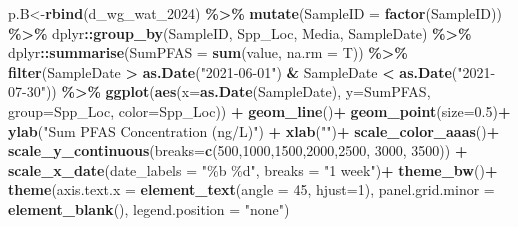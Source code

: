 \documentclass[
]{article}
\newenvironment{Shaded}{\begin{snugshade}}{\end{snugshade}}
\newcommand{\AttributeTok}[1]{\textcolor[rgb]{0.13,0.29,0.53}{#1}}
\newcommand{\DecValTok}[1]{\textcolor[rgb]{0.00,0.00,0.81}{#1}}
\newcommand{\FloatTok}[1]{\textcolor[rgb]{0.00,0.00,0.81}{#1}}
\newcommand{\FunctionTok}[1]{\textcolor[rgb]{0.13,0.29,0.53}{\textbf{#1}}}
\newcommand{\NormalTok}[1]{#1}
\newcommand{\OtherTok}[1]{\textcolor[rgb]{0.56,0.35,0.01}{#1}}
\newcommand{\SpecialCharTok}[1]{\textcolor[rgb]{0.81,0.36,0.00}{\textbf{#1}}}
\newcommand{\StringTok}[1]{\textcolor[rgb]{0.31,0.60,0.02}{#1}}
\begin{document}
\begin{Shaded}
\begin{Highlighting}[]
\NormalTok{p.B}\OtherTok{\textless{}{-}}\FunctionTok{rbind}\NormalTok{(d\_wg\_wat\_2024) }\SpecialCharTok{\%\textgreater{}\%}
  \FunctionTok{mutate}\NormalTok{(}\AttributeTok{SampleID =} \FunctionTok{factor}\NormalTok{(SampleID)) }\SpecialCharTok{\%\textgreater{}\%}
\NormalTok{  dplyr}\SpecialCharTok{::}\FunctionTok{group\_by}\NormalTok{(SampleID, Spp\_Loc, Media, SampleDate) }\SpecialCharTok{\%\textgreater{}\%}
\NormalTok{  dplyr}\SpecialCharTok{::}\FunctionTok{summarise}\NormalTok{(}\AttributeTok{SumPFAS =} \FunctionTok{sum}\NormalTok{(value, }\AttributeTok{na.rm =}\NormalTok{ T)) }\SpecialCharTok{\%\textgreater{}\%}
  \FunctionTok{filter}\NormalTok{(SampleDate }\SpecialCharTok{\textgreater{}} \FunctionTok{as.Date}\NormalTok{(}\StringTok{"2021{-}06{-}01"}\NormalTok{) }\SpecialCharTok{\&}\NormalTok{ SampleDate }\SpecialCharTok{\textless{}} \FunctionTok{as.Date}\NormalTok{(}\StringTok{"2021{-}07{-}30"}\NormalTok{)) }\SpecialCharTok{\%\textgreater{}\%} 
    \FunctionTok{ggplot}\NormalTok{(}\FunctionTok{aes}\NormalTok{(}\AttributeTok{x=}\FunctionTok{as.Date}\NormalTok{(SampleDate), }\AttributeTok{y=}\NormalTok{SumPFAS, }\AttributeTok{group=}\NormalTok{Spp\_Loc, }\AttributeTok{color=}\NormalTok{Spp\_Loc)) }\SpecialCharTok{+}
    \FunctionTok{geom\_line}\NormalTok{()}\SpecialCharTok{+}
    \FunctionTok{geom\_point}\NormalTok{(}\AttributeTok{size=}\FloatTok{0.5}\NormalTok{)}\SpecialCharTok{+}
    \FunctionTok{ylab}\NormalTok{(}\StringTok{"Sum PFAS Concentration (ng/L)"}\NormalTok{) }\SpecialCharTok{+}
    \FunctionTok{xlab}\NormalTok{(}\StringTok{""}\NormalTok{)}\SpecialCharTok{+}
    \FunctionTok{scale\_color\_aaas}\NormalTok{()}\SpecialCharTok{+}
    \FunctionTok{scale\_y\_continuous}\NormalTok{(}\AttributeTok{breaks=}\FunctionTok{c}\NormalTok{(}\DecValTok{500}\NormalTok{,}\DecValTok{1000}\NormalTok{,}\DecValTok{1500}\NormalTok{,}\DecValTok{2000}\NormalTok{,}\DecValTok{2500}\NormalTok{, }\DecValTok{3000}\NormalTok{, }\DecValTok{3500}\NormalTok{)) }\SpecialCharTok{+}
    \FunctionTok{scale\_x\_date}\NormalTok{(}\AttributeTok{date\_labels =} \StringTok{"\%b \%d"}\NormalTok{, }\AttributeTok{breaks =} \StringTok{"1 week"}\NormalTok{)}\SpecialCharTok{+}
    \FunctionTok{theme\_bw}\NormalTok{()}\SpecialCharTok{+}
    \FunctionTok{theme}\NormalTok{(}\AttributeTok{axis.text.x =} \FunctionTok{element\_text}\NormalTok{(}\AttributeTok{angle =} \DecValTok{45}\NormalTok{, }\AttributeTok{hjust=}\DecValTok{1}\NormalTok{),}
          \AttributeTok{panel.grid.minor =} \FunctionTok{element\_blank}\NormalTok{(),}
          \AttributeTok{legend.position =} \StringTok{"none"}\NormalTok{)}



\end{Highlighting}
\end{Shaded}
\end{document}
